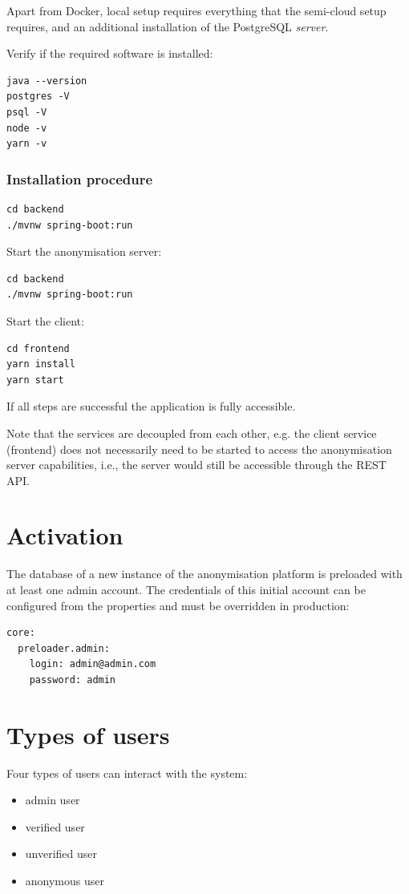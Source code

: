 \documentclass[a4paper,twoside,12pt]{book}
\begin{document}
Apart from Docker, local setup requires everything that the semi-cloud setup requires, and an additional installation of the PostgreSQL \textit{server}.

Verify if the required software is installed:
\begin{verbatim}
java --version
postgres -V
psql -V
node -v
yarn -v
\end{verbatim}

\subsubsection{Installation procedure}

\begin{verbatim}
cd backend
./mvnw spring-boot:run
\end{verbatim}

Start the anonymisation server:
\begin{verbatim}
cd backend
./mvnw spring-boot:run
\end{verbatim}

Start the client:
\begin{verbatim}
cd frontend
yarn install
yarn start
\end{verbatim}

If all steps are successful the application is fully accessible.

Note that the services are decoupled from each other, e.g. the client service (frontend) does not necessarily need to be started to access the anonymisation server capabilities, i.e., the server would still be accessible through the REST API.

\section{Activation}

The database of a new instance of the anonymisation platform is preloaded with at least one admin account. The credentials of this initial account can be configured from the properties and must be overridden in production:
\begin{verbatim}
core:
  preloader.admin:
    login: admin@admin.com
    password: admin
\end{verbatim}


\section{Types of users}

Four types of users can interact with the system:
\begin{itemize}
\item admin user
\item verified user
\item unverified user
\item anonymous user
\end{itemize}
\end{document}
